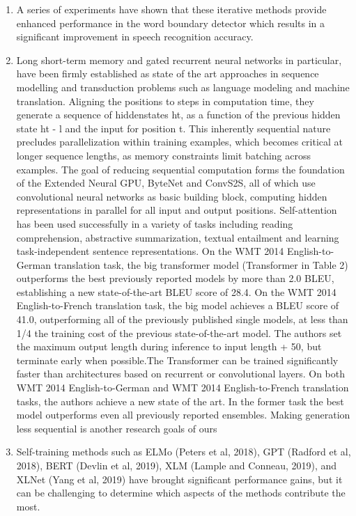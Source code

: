\documentclass[11pt]{article}
\begin{document}
\begin{enumerate}
    \item A series of experiments have shown that these iterative methods provide enhanced performance in the word boundary detector which results in a significant improvement in speech recognition accuracy.\cite{chung}
    \item Long short-term memory\cite{lstm} and gated recurrent\cite{recurrent} neural networks in particular, have been firmly established as state of the art approaches in sequence modelling and transduction problems such as language modeling and machine translation.
    Aligning the positions to steps in computation time, they generate a sequence of hiddenstates ht, as a function of the previous hidden state ht - l and the input for position t. This inherently sequential nature precludes parallelization within training examples, which becomes critical at longer sequence lengths, as memory constraints limit batching across examples.
    The goal of reducing sequential computation forms the foundation of the Extended Neural GPU, ByteNet and ConvS2S, all of which use convolutional neural networks as basic building block, computing hidden representations in parallel for all input and output positions.
    Self-attention has been used successfully in a variety of tasks including reading comprehension, abstractive summarization, textual entailment and learning task-independent sentence representations. On the WMT 2014 English-to-German translation task, the big transformer model (Transformer in Table 2) outperforms the best previously reported models by more than 2.0 BLEU, establishing a new state-of-the-art BLEU score of 28.4.
    On the WMT 2014 English-to-French translation task, the big model achieves a BLEU score of 41.0, outperforming all of the previously published single models, at less than 1/4 the training cost of the previous state-of-the-art model.
    The authors set the maximum output length during inference to input length + 50, but terminate early when possible\cite{schuster}.The Transformer can be trained significantly faster than architectures based on recurrent or convolutional layers.
    On both WMT 2014 English-to-German and WMT 2014 English-to-French translation tasks, the authors achieve a new state of the art.
    In the former task the best model outperforms even all previously reported ensembles.
    Making generation less sequential is another research goals of ours\cite{atayl}
    \item Self-training methods such as ELMo (Peters et al, 2018), GPT (Radford et al, 2018), BERT (Devlin et al, 2019), XLM (Lample and Conneau, 2019), and XLNet (Yang et al, 2019) have brought significant performance gains, but it can be challenging to determine which aspects of the methods contribute the most.

\end{enumerate}
\end{document}
